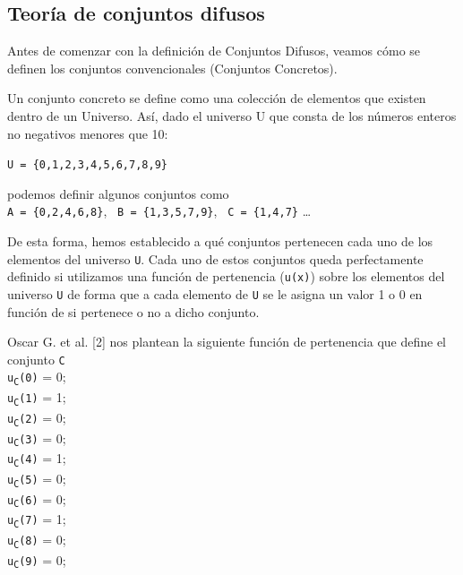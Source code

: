 \subsection{Teoría de conjuntos difusos}
Antes de comenzar con la definición de Conjuntos Difusos, veamos cómo se definen los conjuntos convencionales (Conjuntos Concretos).

Un conjunto concreto se define como una colección de elementos que
existen dentro de un Universo. Así, dado el universo U que consta de los números enteros no negativos menores que 10:

\texttt{U = \{0,1,2,3,4,5,6,7,8,9\}}

podemos definir algunos conjuntos como\\
\newline
\null\hspace{0.59cm}\texttt{A = \{0,2,4,6,8\}},\newline
\null\hspace{0.37cm}\texttt{ B = \{1,3,5,7,9\}},\newline
\null\hspace{0.37cm}\texttt{ C = \{1,4,7\}} \ldots

De esta forma, hemos establecido a qué conjuntos pertenecen cada uno de los elementos del universo \texttt{U}. Cada uno de estos conjuntos queda perfectamente definido si utilizamos una función de pertenencia (\texttt{u(x)}) sobre los elementos del universo \texttt{U} de forma que a cada elemento de \texttt{U} se le asigna un valor 1 o 0 en función de si pertenece o no a dicho conjunto.

Oscar G. et al. [2] nos plantean la siguiente función de pertenencia que define el conjunto \texttt{C}
\\ \newline
\null\hspace{0.59cm}\texttt{u\textsubscript{C}(0)} = 0;\\
\null\hspace{0.59cm}\texttt{u\textsubscript{C}(1)} = 1;\\
\null\hspace{0.59cm}\texttt{u\textsubscript{C}(2)} = 0;\\
\null\hspace{0.59cm}\texttt{u\textsubscript{C}(3)} = 0;\\
\null\hspace{0.59cm}\texttt{u\textsubscript{C}(4)} = 1;\\
\null\hspace{0.59cm}\texttt{u\textsubscript{C}(5)} = 0;\\
\null\hspace{0.59cm}\texttt{u\textsubscript{C}(6)} = 0;\\
\null\hspace{0.59cm}\texttt{u\textsubscript{C}(7)} = 1;\\
\null\hspace{0.59cm}\texttt{u\textsubscript{C}(8)} = 0;\\
\null\hspace{0.59cm}\texttt{u\textsubscript{C}(9)} = 0;

